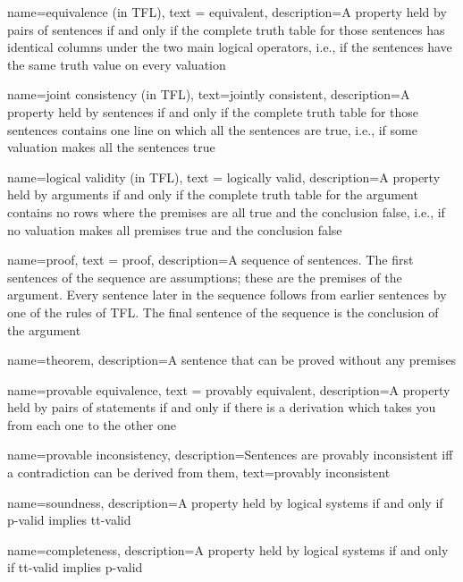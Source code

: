 {
  name=equivalence (in TFL),
  text = equivalent,
description={A property held by pairs of sentences if and only if the \gls{complete truth table} for those sentences has identical columns under the two main logical operators, i.e., if the sentences have the same truth value on every valuation}
}


{
  name=joint consistency (in TFL),
  text=jointly consistent,
description={A property held by sentences if and only if the \gls{complete truth table} for those sentences contains one line on which all the sentences are true, i.e., if some \gls{valuation} makes all the sentences true}
}




{
  name=logical validity (in TFL),
  text = logically valid,
description={A property held by arguments if and only if the \gls{complete truth table} for the argument contains no rows where the \glspl{premise} are all true and the \gls{conclusion} false, i.e., if no \gls{valuation} makes all premises true and the conclusion false}
}



{
  name=proof,
  text = proof,
description={A sequence of sentences. The first sentences of the sequence are assumptions; these are the premises of the argument. Every sentence later in the sequence follows from earlier sentences by one of the rules of TFL. The final sentence of the sequence is the conclusion of the argument}
}



{
name=theorem,
description={A sentence that can be proved without any premises}
}


{
  name=provable equivalence,
  text = provably equivalent,
description={A property held by pairs of statements if and only if there is a derivation which takes you from each one to the other one}
}

{    name={provable inconsistency}, 
  description={Sentences are provably inconsistent iff a contradiction can be derived from them},
    text={provably inconsistent}
}


{
name=soundness,
description={A property held by logical systems if and only if p-valid implies tt-valid}
}


{
name=completeness,
description={A property held by logical systems if and only if tt-valid implies p-valid}
}




